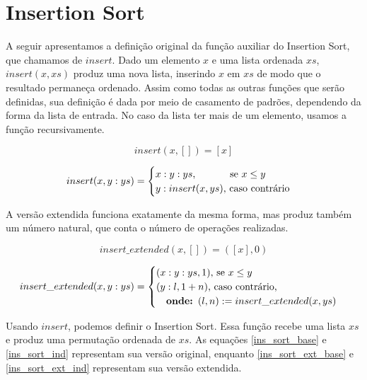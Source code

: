 \documentclass[12pt, oneside, a4paper,english,brazil]{abntex2}
\begin{document}
\section{Insertion Sort}

\qquad A seguir apresentamos a defini\c{c}\~ao original da fun\c{c}\~ao auxiliar do
Insertion Sort, que chamamos de $insert$. Dado um elemento $x$ e uma lista ordenada $xs$,
$insert(x,xs)$ produz uma nova lista, inserindo $x$ em $xs$ de modo que o resultado
permane\c{c}a ordenado. Assim como todas as outras fun\c{c}\~oes que ser\~ao definidas,
sua defini\c{c}\~ao \'e dada por meio de casamento de padr\~oes,
dependendo da forma da lista de entrada. No caso da lista ter mais de um elemento, usamos
a fun\c{c}\~ao recursivamente.

\begin{equation} \label{ins_base}
insert(x, []) = [x]
\end{equation}

\begin{equation} \label{ins_ind}
insert(x, y : ys) =
  \begin{cases}
    x : y : ys \text{, \qquad\,\,\,\,\, se } x \le y\\
    y : insert(x, ys) \text{, caso contr\'ario}
  \end{cases}
\end{equation}

\newpage
\qquad A vers\~ao extendida funciona exatamente da mesma forma, mas produz tamb\'em um
n\'umero natural, que conta o n\'umero de opera\c{c}\~oes realizadas.

\begin{equation} \label{ins_ext_base}
insert\_extended(x, []) = ([x], 0)
\end{equation}

\begin{equation} \label{ins_ext_ind}
insert\_extended(x, y : ys) =
  \begin{cases}
    (x : y : ys, 1) \text{, se } x \le y\\
    (y : l, 1 + n) \text{, caso contr\'ario,}\\ \text{\quad \textbf{onde: }} (l, n) := insert\_extended(x, ys)
  \end{cases}
\end{equation}

\qquad Usando $insert$, podemos definir o Insertion Sort.
Essa fun\c{c}\~ao recebe uma lista $xs$ e produz uma permuta\c{c}\~ao ordenada de $xs$.
As equa\c{c}\~oes \ref{ins_sort_base} e \ref{ins_sort_ind} representam sua vers\~ao original, enquanto
\ref{ins_sort_ext_base} e \ref{ins_sort_ext_ind} representam sua vers\~ao extendida.
\end{document}
